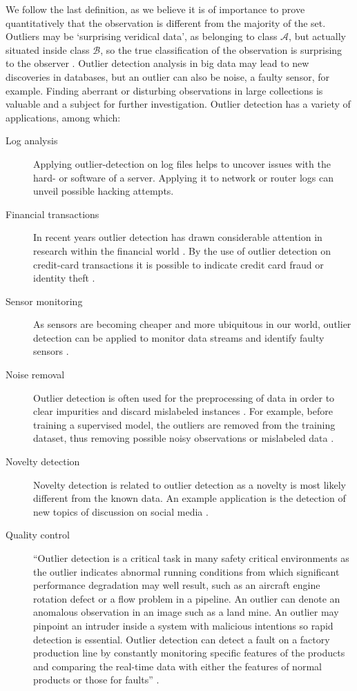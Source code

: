 We follow the last definition, as we believe it is of importance to prove quantitatively that the observation is different from the majority of the set. Outliers may be `surprising veridical data', as belonging to class $\mathcal{A}$, but actually situated inside class $\mathcal{B}$, so the true classification of the observation is surprising to the observer \cite{John95robustdecision}. Outlier detection analysis in big data may lead to new discoveries in databases, but an outlier can also be noise, a faulty sensor, for example. Finding aberrant or disturbing observations in large collections is valuable and a subject for further investigation. Outlier detection has a variety of applications, among which:

\begin{description}
  \item[Log analysis] Applying outlier-detection on log files helps to uncover issues with the hard- or software of a server. Applying it to network or router logs can unveil possible hacking attempts. 
  \item[Financial transactions] In recent years outlier detection has drawn considerable attention in research within the financial world \cite{Kanhere2014}. By the use of outlier detection on credit-card transactions it is possible to indicate credit card fraud or identity theft \cite{618940}.
  \item[Sensor monitoring] As sensors are becoming cheaper and more ubiquitous in our world, outlier detection can be applied to monitor data streams and identify faulty sensors \cite{Fujimaki:2005:ASA:1081870.1081917}.
  \item[Noise removal] Outlier detection is often used for the preprocessing of data in order to clear impurities and discard mislabeled instances \cite{Brodley96identifyingand}. For example, before training a supervised model, the outliers are removed from the training dataset, thus removing possible noisy observations or mislabeled data \cite{63857}.
  \item[Novelty detection] Novelty detection is related to outlier detection as a novelty is most likely different from the known data. An example application is the detection of new topics of discussion on social media \cite{Markou20032481,Markou20032499,SPC3:SPC3353}.
  \item[Quality control] ``Outlier detection is a critical task in many safety critical environments as the outlier indicates abnormal running conditions from which significant performance degradation may well result, such as an aircraft engine rotation defect or a flow problem in a pipeline. An outlier can denote an anomalous observation in an image such as a land mine. An outlier may pinpoint an intruder inside a system with malicious intentions so rapid detection is essential. Outlier detection can detect a fault on a factory production line by constantly monitoring specific features of the products and comparing the real-time data with either the features of normal products or those for faults'' \cite{6416666}.
\end{description}

